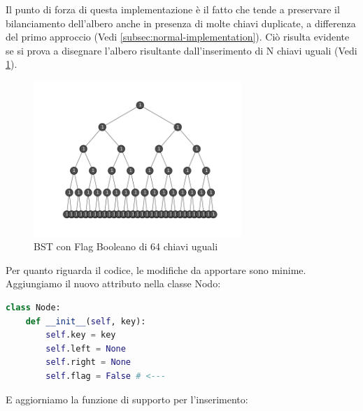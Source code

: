 \documentclass{article}
\begin{document}
Il punto di forza di questa implementazione è il fatto che tende a preservare il bilanciamento dell'albero anche in presenza di molte chiavi duplicate, a differenza del primo approccio (Vedi \ref{subsec:normal-implementation}). Ciò risulta evidente se si prova a disegnare l'albero risultante dall'inserimento di N chiavi uguali (Vedi \cref{fig:bst-flag}).



\begin{figure}[H]
  \centering
  \includegraphics[width=0.7\textwidth]{./images/bst-flag}
  \caption{BST con Flag Booleano di 64 chiavi uguali}
  \label{fig:bst-flag}
\end{figure}



Per quanto riguarda il codice, le modifiche da apportare sono minime.
Aggiungiamo il nuovo attributo nella classe Nodo:

\begin{lstlisting}[language=Python]
class Node:
    def __init__(self, key):
        self.key = key
        self.left = None
        self.right = None
        self.flag = False # <---
\end{lstlisting}

E aggiorniamo la funzione di supporto per l'inserimento:
\end{document}
